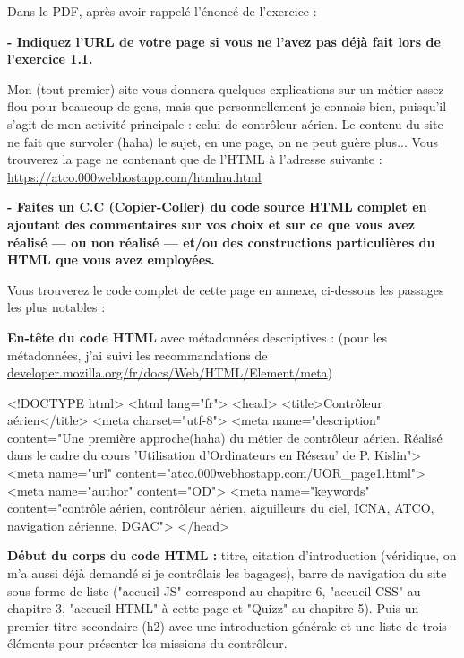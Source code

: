 \documentclass[11pt]{article}
\begin{document}
Dans le PDF, après avoir rappelé l’énoncé de l’exercice :

\medskip

\textbf{- Indiquez l’URL de votre page si vous ne l’avez pas déjà fait lors de l’exercice 1.1.}

Mon (tout premier) site vous donnera quelques explications sur un métier assez flou pour beaucoup de gens, mais que personnellement je connais bien, puisqu’il s’agit de mon activité principale : celui de contrôleur aérien. Le contenu du site ne fait que survoler (haha) le sujet, en une page, on ne peut guère plus... Vous trouverez la page ne contenant que de l’HTML à l’adresse suivante : \url{https://atco.000webhostapp.com/htmlnu.html}

\medskip

\textbf{- Faites un C.C (Copier-Coller) du code source HTML complet en ajoutant des commentaires sur vos choix et sur ce que vous avez réalisé — ou non réalisé — et/ou des constructions particulières du HTML que vous avez employées.}
	
\medskip

Vous trouverez le code complet de cette page en annexe, ci-dessous les passages les plus notables :

\textbf{En-tête du code HTML} avec métadonnées descriptives : (pour les métadonnées, j’ai suivi les recommandations de \url{developer.mozilla.org/fr/docs/Web/HTML/Element/meta})

\smallskip

	\begin{code2}
<!DOCTYPE html>
<html lang="fr">
  	<head>
    	<title>Contrôleur aérien</title>
    	<meta charset="utf-8">
    	<meta name="description" content="Une première approche(haha) du métier de contrôleur aérien. Réalisé dans le cadre du cours 'Utilisation d'Ordinateurs en Réseau' de P. Kislin">
    	<meta name="url" content="atco.000webhostapp.com/UOR_page1.html">
    	<meta name="author" content="OD">
    	<meta name="keywords" content="contrôle aérien, contrôleur aérien, aiguilleurs du ciel, ICNA, ATCO, navigation aérienne, DGAC">
  	</head>
\end{code2}
	
	\textbf{Début du corps du code HTML :} titre, citation d’introduction (véridique, on m’a aussi déjà demandé si je contrôlais les bagages), barre de navigation du site sous forme de liste ("accueil JS" correspond au chapitre 6, "accueil CSS" au chapitre 3, "accueil HTML" à cette page et "Quizz" au chapitre 5). Puis un premier titre secondaire (h2) avec une introduction générale et une liste de trois éléments pour présenter les missions du contrôleur.
	
\end{document}
